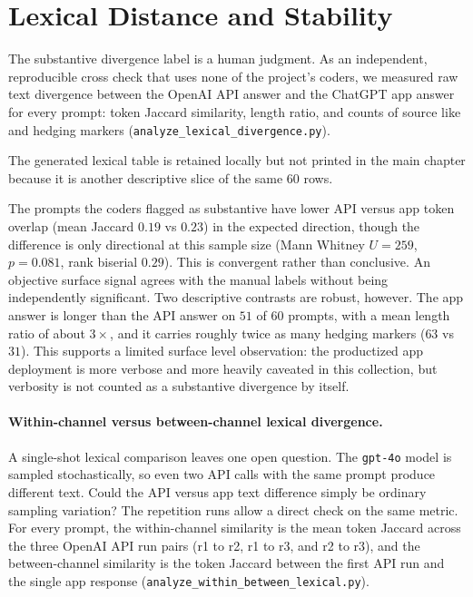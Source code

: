 \section{Lexical Distance and Stability}

The substantive divergence label is a human judgment. As an independent,
reproducible cross check that uses none of the project's coders, we measured raw
text divergence between the OpenAI API answer and the ChatGPT app answer for every
prompt: token Jaccard similarity, length ratio, and counts of source like and
hedging markers (\texttt{analyze\_lexical\_divergence.py}).

The generated lexical table is retained locally but not printed in the main
chapter because it is another descriptive slice of the same 60 rows.

The prompts the coders flagged as substantive have lower API versus app token
overlap (mean Jaccard $0.19$ vs $0.23$) in the expected direction, though the
difference is only directional at this sample size (Mann Whitney $U=259$,
$p=0.081$, rank biserial $0.29$). This is convergent rather than conclusive. An
objective surface signal agrees with the manual labels without being independently
significant. Two descriptive contrasts are robust, however. The app answer is
longer than the API answer on $51$ of $60$ prompts, with a mean length ratio of
about $3\times$, and it carries roughly twice as many hedging markers
($63$ vs $31$). This supports a limited surface level observation: the productized
app deployment is more verbose and more heavily caveated in this collection, but
verbosity is not counted as a substantive divergence by itself.

\paragraph{Within-channel versus between-channel lexical divergence.}

A single-shot lexical comparison leaves one open question. The \texttt{gpt-4o}
model is sampled
stochastically, so even two API calls with the same prompt produce different
text. Could the API versus app text difference simply be ordinary sampling
variation? The repetition runs allow a direct check on the same metric. For
every prompt, the within-channel similarity is the mean token Jaccard across
the three OpenAI API run pairs (r1 to r2, r1 to r3, and r2 to r3), and the
between-channel similarity is the token Jaccard between the first API run and
the single app response
(\texttt{analyze\_within\_between\_lexical.py}).


